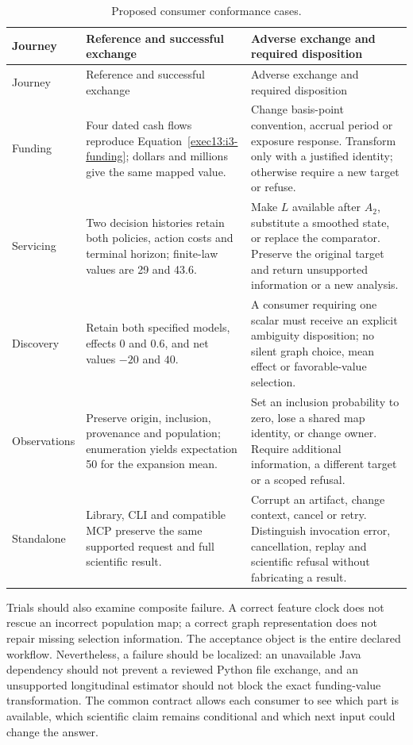 \begin{longtable}{p{.17\linewidth}p{.37\linewidth}p{.37\linewidth}}
\caption{Proposed consumer conformance cases.}
\label{exec13:i3-conformance}\\
\toprule Journey & Reference and successful exchange & Adverse exchange and required disposition \\
\midrule\endfirsthead
\toprule Journey & Reference and successful exchange & Adverse exchange and required disposition \\
\midrule\endhead
Funding & Four dated cash flows reproduce
Equation~\eqref{exec13:i3-funding}; dollars and millions give the same
mapped value. & Change basis-point convention, accrual period or exposure
response. Transform only with a justified identity; otherwise require a
new target or refuse. \\
Servicing & Two decision histories retain both policies, action costs and
terminal horizon; finite-law values are 29 and 43.6. & Make $L$ available
after $A_2$, substitute a smoothed state, or replace the comparator. Preserve
the original target and return unsupported information or a new analysis. \\
Discovery & Retain both specified models, effects $0$ and $0.6$, and net
values $-20$ and $40$. & A consumer requiring one scalar must receive an
explicit ambiguity disposition; no silent graph choice, mean effect or
favorable-value selection. \\
Observations & Preserve origin, inclusion, provenance and population;
enumeration yields expectation 50 for the expansion mean. & Set an inclusion
probability to zero, lose a shared map identity, or change owner. Require
additional information, a different target or a scoped refusal. \\
Standalone & Library, CLI and compatible MCP preserve the same supported
request and full scientific result. & Corrupt an artifact, change context,
cancel or retry. Distinguish invocation error, cancellation, replay and
scientific refusal without fabricating a result. \\
\bottomrule
\end{longtable}

Trials should also examine composite failure. A correct feature clock does
not rescue an incorrect population map; a correct graph representation does
not repair missing selection information. The acceptance object is the entire
declared workflow. Nevertheless, a failure should be localized: an unavailable
Java dependency should not prevent a reviewed Python file exchange, and an
unsupported longitudinal estimator should not block the exact funding-value
transformation. The common contract allows each consumer to see which part
is available, which scientific claim remains conditional and which next
input could change the answer.

